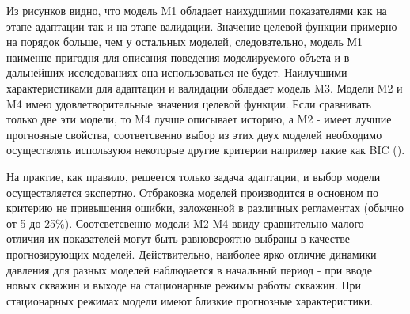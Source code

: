 \documentclass{article}
\begin{document}
Из рисунков видно, что модель M1 обладает наихудшими показателями как на этапе адаптации так и на этапе валидации. Значение целевой функции примерно на порядок больше, чем у остальных моделей, следовательно, модель М1 наименне пригодня для описания поведения моделируемого объета и в дальнейших исследованиях она использоваться не будет. Наилучшими характеристиками для адаптации и валидации обладает модель M3. Модели M2 и M4 имею удовлетворительные значения целевой функции. Если сравнивать только две эти модели, то M4 лучше описывает историю, а M2 - имеет лучшие прогнозные свойства, соответсвенно выбор из этих двух моделей необходимо осуществлять используюя некоторые другие критерии например такие как BIC (\cite{mus}).

На практие, как правило, решеется только задача адаптации, и выбор модели осуществляется экспертно. Отбраковка моделей производится в основном по критерию не привышения ошибки, заложенной в различных регламентах (обычно от 5 до 25\%). Соотсветсвенно модели M2-M4 ввиду сравнительно малого отличия их показателей могут быть равновероятно выбраны в качестве прогнозирующих моделей. Действительно, наиболее ярко отличие динамики давления для разных моделей наблюдается в начальный период - при вводе новых скважин и выходе на стационарные режимы работы скважин. При стационарных режимах модели имеют близкие прогнозные характеристики. 
\end{document}
